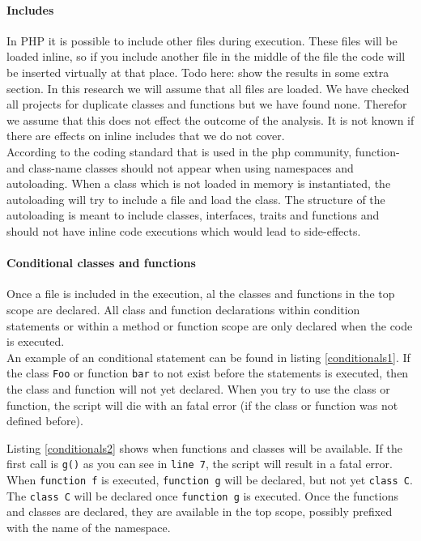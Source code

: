 \documentclass[../main.tex]{subfiles}
\begin{document}
    \paragraph{Includes}
    In PHP it is possible to include other files during execution. 
    These files will be loaded inline, so if you include another file in the middle of the file the code will be inserted virtually at that place.
    Todo here: show the results in some extra section.
    In this research we will assume that all files are loaded.
    We have checked all projects for duplicate classes and functions but we have found none.
    Therefor we assume that this does not effect the outcome of the analysis.
    It is not known if there are effects on inline includes that we do not cover.
    \\
    According to the coding standard that is used in the php community\footnotemark, function- and class-name classes should not appear when using namespaces and autoloading.
    When a class which is not loaded in memory is instantiated, the autoloading will try to include a file and load the class.
    The structure of the autoloading is meant to include classes, interfaces, traits and functions and should not have inline code executions which would lead to side-effects.
    
    \paragraph{Conditional classes and functions}
    Once a file is included in the execution, al the classes and functions in the top scope are declared.
    All class and function declarations within condition statements or within a method or function scope are only declared when the code is executed.
    \\
    An example of an conditional statement can be found in listing \ref{conditionals1}.
    If the class \texttt{Foo} or function \texttt{bar} to not exist before the statements is executed, then the class and function will not yet declared. 
    When you try to use the class or function, the script will die with an fatal error (if the class or function was not defined before).

    

    Listing \ref{conditionals2} shows when functions and classes will be available.
    If the first call is \texttt{g()} as you can see in \texttt{line 7}, the script will result in a fatal error.
    When \texttt{function f} is executed, \texttt{function g} will be declared, but not yet \texttt{class C}.
    The \texttt{class C} will be declared once \texttt{function g} is executed.
    Once the functions and classes are declared, they are available in the top scope, possibly prefixed with the name of the namespace.
    
\end{document}
